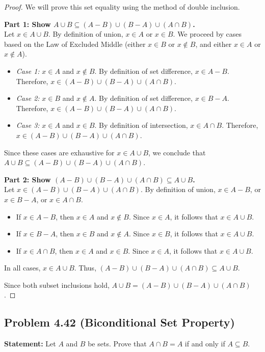 \documentclass[11pt]{article}
\theoremstyle{definition}
\theoremstyle{remark}
\begin{document}
\begin{proof}
We will prove this set equality using the method of double inclusion.

\textbf{Part 1: Show $A \cup B \subseteq (A - B) \cup (B - A) \cup (A \cap B)$.} \\
Let $x \in A \cup B$. By definition of union, $x \in A$ or $x \in B$. We proceed by cases based on the Law of Excluded Middle (either $x \in B$ or $x \notin B$, and either $x \in A$ or $x \notin A$).
\begin{itemize}
    \item \textit{Case 1:} $x \in A$ and $x \notin B$. By definition of set difference, $x \in A - B$. Therefore, $x \in (A - B) \cup (B - A) \cup (A \cap B)$.
    \item \textit{Case 2:} $x \in B$ and $x \notin A$. By definition of set difference, $x \in B - A$. Therefore, $x \in (A - B) \cup (B - A) \cup (A \cap B)$.
    \item \textit{Case 3:} $x \in A$ and $x \in B$. By definition of intersection, $x \in A \cap B$. Therefore, $x \in (A - B) \cup (B - A) \cup (A \cap B)$.
\end{itemize}
Since these cases are exhaustive for $x \in A \cup B$, we conclude that $A \cup B \subseteq (A - B) \cup (B - A) \cup (A \cap B)$.

\textbf{Part 2: Show $(A - B) \cup (B - A) \cup (A \cap B) \subseteq A \cup B$.} \\
Let $x \in (A - B) \cup (B - A) \cup (A \cap B)$. By definition of union, $x \in A - B$, or $x \in B - A$, or $x \in A \cap B$.
\begin{itemize}
    \item If $x \in A - B$, then $x \in A$ and $x \notin B$. Since $x \in A$, it follows that $x \in A \cup B$.
    \item If $x \in B - A$, then $x \in B$ and $x \notin A$. Since $x \in B$, it follows that $x \in A \cup B$.
    \item If $x \in A \cap B$, then $x \in A$ and $x \in B$. Since $x \in A$, it follows that $x \in A \cup B$.
\end{itemize}
In all cases, $x \in A \cup B$. Thus, $(A - B) \cup (B - A) \cup (A \cap B) \subseteq A \cup B$.

Since both subset inclusions hold, $A \cup B = (A - B) \cup (B - A) \cup (A \cap B)$.
\end{proof}

\subsection{Problem 4.42 (Biconditional Set Property)}
\textbf{Statement:} Let $A$ and $B$ be sets. Prove that $A \cap B = A$ if and only if $A \subseteq B$.
\end{document}
